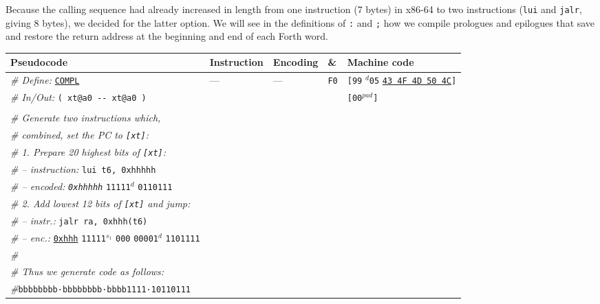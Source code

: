 \documentclass[a4paper,12pt,final]{article}
\begin{document}
Because the calling sequence had already increased in length from one
instruction (7 bytes) in x86-64 to two instructions (\texttt{lui} and \texttt{jalr},
giving 8 bytes), we decided for the latter option.  We will see in the
definitions of \texttt{:} and \texttt{;} how we compile prologues and epilogues that
save and restore the return address at the beginning and end of each
Forth word.

\begin{table}[!htbp] \begin{adjustwidth}{-1cm}{-1cm} \fontsize{7}{8.400000}\selectfont
\begin{center}
\begin{tabular}{l|ll|l|l}
\textbf{Pseudocode} & \textbf{Instruction} & \textbf{Encoding} & \textbf{\&} & \textbf{Machine code}\\[0pt]
\hline
\emph{\# Define:} \uline{\texttt{COMPL}} & --- & --- & \texttt{F0} & \texttt{[99} \(^{d}\)​\texttt{05} \uline{\texttt{43 4F 4D 50 4C}}​\texttt{]}\\[0pt]
\emph{\# In/Out:} \texttt{( xt@a0 -{}-{} xt@a0 )} &  &  &  & \texttt{[00}​\(^{pad}\)​\texttt{]}\\[0pt]
 &  &  &  & \\[0pt]
\emph{\# Generate two instructions which,} &  &  &  & \\[0pt]
\emph{\# combined, set the PC to \texttt{[xt]}:} &  &  &  & \\[0pt]
\emph{\# 1. Prepare 20 highest bits of \texttt{[xt]}:} &  &  &  & \\[0pt]
\emph{\# – instruction:} \texttt{lui t6, 0xhhhhh} &  &  &  & \\[0pt]
\emph{\# – encoded:} \emph{\texttt{0xhhhhh}} \texttt{11111}​\(^{d}\) \texttt{0110111} &  &  &  & \\[0pt]
\emph{\# 2. Add lowest 12 bits of \texttt{[xt]} and jump:} &  &  &  & \\[0pt]
\emph{\# – instr.:} \texttt{jalr ra, 0xhhh(t6)} &  &  &  & \\[0pt]
\emph{\# – enc.:} \uline{\texttt{0xhhh}} \texttt{11111}​\(^{s_{1}}\) \texttt{000} \texttt{00001}​\(^{d}\) \texttt{1101111} &  &  &  & \\[0pt]
\emph{\#} &  &  &  & \\[0pt]
\emph{\# Thus we generate code as follows:} &  &  &  & \\[0pt]
\emph{\#}\hspace{1.053000em}​\texttt{bbbbbbbb·bbbbbbbb·bbbb1111·10110111} &  &  &  & \\[0pt]

\end{tabular}
\end{center}
\end{adjustwidth}
\end{table}
\end{document}
